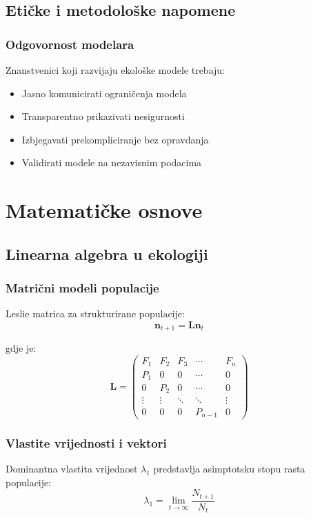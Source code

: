 \documentclass[12pt,a4paper,twoside]{book}
\begin{document}
	\section{Etičke i metodološke napomene}
	
	\subsection{Odgovornost modelara}
	Znanstvenici koji razvijaju ekološke modele trebaju:
	\begin{itemize}
		\item Jasno komunicirati ograničenja modela
		\item Transparentno prikazivati nesigurnosti
		\item Izbjegavati prekompliciranje bez opravdanja
		\item Validirati modele na nezavisnim podacima
	\end{itemize}
	
	\chapter{Matematičke osnove}
	
	\section{Linearna algebra u ekologiji}
	
	\subsection{Matrični modeli populacije}
	Leslie matrica za strukturirane populacije:
	\begin{equation}
		\mathbf{n}_{t+1} = \mathbf{L} \mathbf{n}_t
	\end{equation}
	
	gdje je:
	\begin{equation}
		\mathbf{L} = \begin{pmatrix}
			F_1 & F_2 & F_3 & \cdots & F_n \\
			P_1 & 0 & 0 & \cdots & 0 \\
			0 & P_2 & 0 & \cdots & 0 \\
			\vdots & \vdots & \ddots & \ddots & \vdots \\
			0 & 0 & 0 & P_{n-1} & 0
		\end{pmatrix}
	\end{equation}
	
	\subsection{Vlastite vrijednosti i vektori}
	Dominantna vlastita vrijednost $\lambda_1$ predstavlja asimptotsku stopu rasta populacije:
	\begin{equation}
		\lambda_1 = \lim_{t \to \infty} \frac{N_{t+1}}{N_t}
	\end{equation}
	
\end{document}
